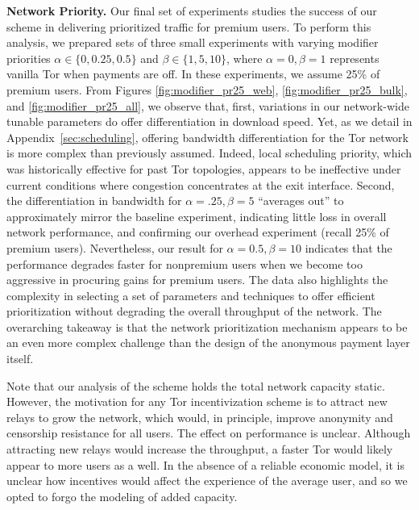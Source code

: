 \medskip \noindent \textbf{Network Priority.}
\label{sec:priority_exp} Our final set of experiments studies the success of our scheme in delivering prioritized traffic for premium users.
To perform this analysis, we prepared sets of three small experiments with varying modifier priorities $\alpha \in \{0, 0.25, 0.5\}$ and $\beta \in \{1, 5, 10\}$, where $\alpha = 0, \beta = 1$ represents vanilla Tor when payments are off.
In these experiments, we assume 25\% of premium users.
From Figures \ref{fig:modifier_pr25_web}, \ref{fig:modifier_pr25_bulk}, and \ref{fig:modifier_pr25_all}, we observe that, first, variations in our network-wide tunable parameters do offer differentiation in download speed.
Yet, as we detail in Appendix~\ref{sec:scheduling}, offering bandwidth differentiation for the Tor network is more complex than previously assumed.
Indeed, local scheduling priority, which was historically effective for past Tor topologies, appears to be ineffective under current conditions where congestion concentrates at the exit interface.
Second, the differentiation in bandwidth for $\alpha = .25, \beta=5$ ``averages out'' to approximately mirror the baseline experiment, indicating little loss in overall network performance, and confirming our overhead experiment (recall 25\% of premium users).
Nevertheless, our result for $\alpha = 0.5, \beta=10$ indicates that the performance degrades faster for nonpremium users when we become too aggressive in procuring gains for premium users.
The data also highlights the complexity in selecting a set of parameters and techniques to offer efficient prioritization without degrading the overall throughput of the network.
The overarching takeaway is that the network prioritization mechanism appears to be an even more complex challenge than the design of the anonymous payment layer itself.

Note that our analysis of the scheme holds the total network capacity static.
However, the motivation for any Tor incentivization scheme is to attract new relays to grow the network, which would, in principle, improve anonymity and censorship resistance for all users.
The effect on performance is unclear.
Although attracting new relays would increase the throughput, a faster Tor would likely appear to more users as a well.
In the absence of a reliable economic model, it is unclear how incentives would affect the experience of the average user, and so we opted to forgo the modeling of added capacity.


